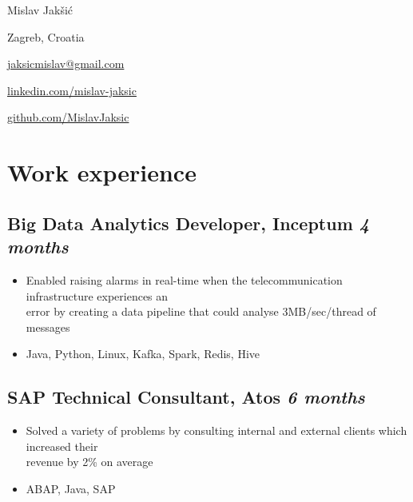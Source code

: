 \documentclass[a4paper]{article}
\newcommand{\bolditalicpair}
[2]
{\textbf{#1} \texorpdfstring{\hfill}{} \textit{#2}}
\begin{document}
\begin{multicols}{2}

\noindent
\begin{minipage}{.49\textwidth}
\raggedright

{\huge Mislav Jakšić}

Zagreb, Croatia
\end{minipage}

\noindent
\begin{minipage}{.49\textwidth}
\raggedleft

\href{mailto:jaksicmislav@gmail.com}{jaksicmislav@gmail.com}

\href{https://linkedin.com/in/mislav-jaksic}{linkedin.com/mislav-jaksic}

\href{https://github.com/MislavJaksic}{github.com/MislavJaksic}
\end{minipage}

\end{multicols}



\section{Work experience}
\subsection{\bolditalicpair{Big Data Analytics Developer, Inceptum}{4 months}}

\begin{itemize}
  \item Enabled raising alarms in real-time when the telecommunication infrastructure experiences an \\
  error by creating a data pipeline that could analyse 3MB/sec/thread of messages
  \item Java, Python, Linux, Kafka, Spark, Redis, Hive
\end{itemize}

\subsection{\bolditalicpair{SAP Technical Consultant, Atos}{6 months}}

\begin{itemize}
  \item Solved a variety of problems by consulting internal and external clients which increased their \\
  revenue by 2\% on average
  \item ABAP, Java, SAP
\end{itemize}
\end{document}

